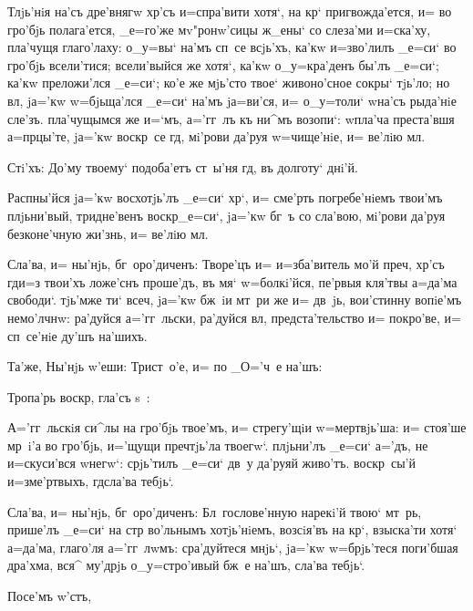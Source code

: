 Тлjь'нiя на'съ дре'внягw хр'съ и=спра'вити хотя`, 
на кр` пригвожда'ется, и= во гро'бjь полага'ется, 
_е=го'же мv"ронw'сицы ж_ены` со слеза'ми и=ска'ху, 
пла'чущя глаго'лаху: о_у=вы` на'мъ сп~се всjь'хъ, ка'кw 
и=зво'лилъ _е=си` во гро'бjь всели'тися; всели'выйся же 
хотя`, ка'кw о_у=кра'денъ бы'лъ _е=си`; ка'кw преложи'лся 
_е=си`; ко'е же мjь'сто твое` живоно'сное сокры` тjь'ло; 
но вл, jа='кw w=бjьща'лся _е=си` на'мъ jа=ви'ся, и= 
о_у=толи` w\т на'съ рыда'нiе сле'зъ. пла'чущымся же 
и=`мъ, а='гг~лъ къ ни^мъ возопи`: w\т пла'ча преста'вшя 
а=п рцы'те, jа='кw воскр~се гд, мi'рови да'руя 
w=чище'нiе, и= ве'лiю мл. 

Стi'хъ: До'му твоему` подоба'етъ ст~ы'ня гд, въ 
долготу` днi'й. 

Распны'йся jа='кw восхотjь'лъ _е=си` хр`, и= 
сме'рть погребе'нiемъ твои'мъ плjьни'вый, тридне'венъ 
воскр _е=си`, jа='кw бг~ъ со сла'вою, мi'рови да'руя 
безконе'чную жи'знь, и= ве'лiю мл.

Сла'ва, и= ны'нjь, бг~оро'диченъ: Творе'цъ и= 
и=зба'витель мо'й преч, хр'съ гд и=з\ъ 
твои'хъ ложе'снъ проше'дъ, въ мя` w=болкi'йся, пе'рвыя 
кля'твы а=да'ма свободи`. тjь'мже ти` всеч, jа='кw 
бж~iи мт~ри же и= дв~jь, вои'стинну вопiе'мъ немо'лчнw: 
ра'дуйся а='гг~льски, ра'дуйся вл, предста'тельство 
и= покро'ве, и= сп~се'нiе ду'шъ на'шихъ. 

Та'же, Ны'нjь w'еши: Трист~о'е, и= по _О='ч~е 
на'шъ:

Тропа'рь воскр, гла'съ s~:

А='гг~льскiя си^лы на гро'бjь твое'мъ, и= стрегу'щiи 
w=мертвjь'ша: и= стоя'ше мр~i'а во гро'бjь, и='щущи 
преч тjь'ла твоегw`. плjьни'лъ _е=си` а='дъ, не 
и=скуси'вся w\т негw`: срjь'тилъ _е=си` дв~у да'руяй 
живо'тъ. воскр~сы'й и=з\ъ ме'ртвыхъ, гд сла'ва тебjь`.

Сла'ва, и= ны'нjь, бг~оро'диченъ: Бл~гослове'нную 
нарекi'й твою` мт~рь, прише'лъ _е=си` на стр 
во'льнымъ хотjь'нiемъ, возсiя'въ на кр`, взыска'ти 
хотя` а=да'ма, глаго'ля а='гг~лwмъ: сра'дуйтеся мнjь`, 
jа='кw w=брjь'теся поги'бшая дра'хма, вся^ му'дрjь 
о_у=стро'ивый бж~е на'шъ, сла'ва тебjь`.

Посе'мъ w'стъ,
